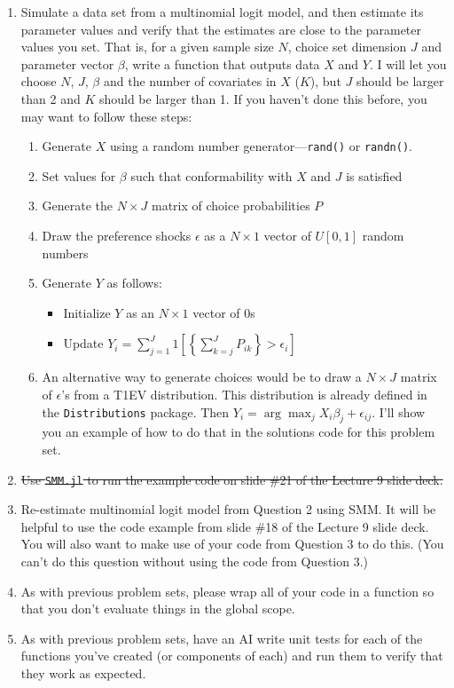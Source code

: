 \documentclass[12pt,english]{article}
\begin{document}
\begin{enumerate}
\item Simulate a data set from a multinomial logit model, and then estimate its parameter values and verify that the estimates are close to the parameter values you set. That is, for a given sample size $N$, choice set dimension $J$ and parameter vector $\beta$, write a function that outputs data $X$ and $Y$. I will let you choose $N$, $J$, $\beta$ and the number of covariates in $X$ ($K$), but $J$ should be larger than 2 and $K$ should be larger than 1. If you haven't done this before, you may want to follow these steps:
    \begin{enumerate}
    \item Generate $X$ using a random number generator---\texttt{rand()} or \texttt{randn()}.
    \item Set values for $\beta$ such that conformability with $X$ and $J$ is satisfied
    \item Generate the $N\times J$ matrix of choice probabilities $P$
    \item Draw the preference shocks $\epsilon$ as a $N\times 1$ vector of $U[0,1]$ random numbers
    \item Generate $Y$ as follows:
        \begin{itemize}
        \item Initialize $Y$ as an $N\times 1$ vector of 0s
        \item Update $Y_i = \sum_{j=1}^J 1\left[\left\{\sum_{k=j}^J  P_{ik}\right\} > 
        \epsilon_i\right]$
        \end{itemize}
    \item An alternative way to generate choices would be to draw a $N\times J$ matrix of $\epsilon$'s from a T1EV distribution. This distribution is already defined in the \texttt{Distributions} package. Then $Y_i = \arg \max_{j} X_i \beta_j + \epsilon_{ij}$. I'll show you an example of how to do that in the solutions code for this problem set.
    \end{enumerate}
\item \sout{Use \texttt{SMM.jl} to run the example code on slide \#21 of the Lecture 9 slide deck.}

\item Re-estimate multinomial logit model from Question 2 using SMM. It will be helpful to use the code example from slide \#18 of the Lecture 9 slide deck. You will also want to make use of your code from Question 3 to do this. (You can't do this question without using the code from Question 3.)

\item As with previous problem sets, please wrap all of your code in a function so that you don't evaluate things in the global scope.


\item As with previous problem sets, have an AI write unit tests for each of the functions you've created (or components of each) and run them to verify that they work as expected.

\end{enumerate}
\end{document}
